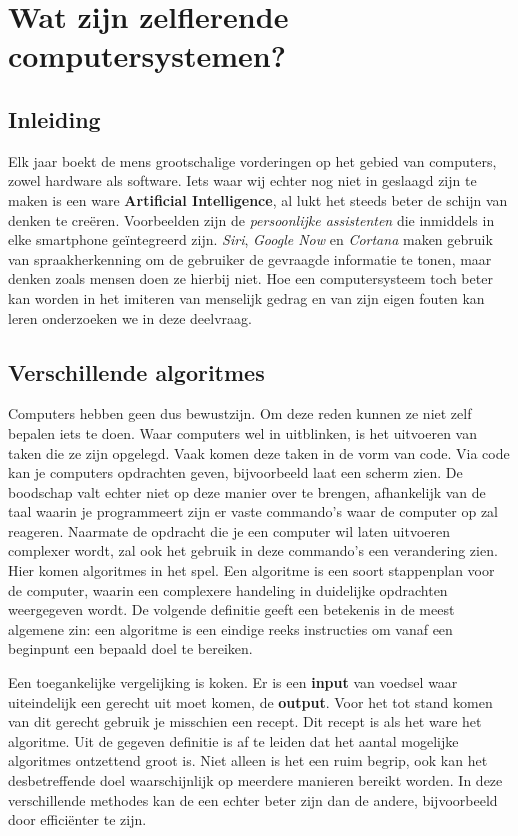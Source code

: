 \section{Wat zijn zelflerende computersystemen?}

\subsection{Inleiding}
Elk jaar boekt de mens grootschalige vorderingen op het gebied van computers, zowel hardware als software. Iets waar wij echter nog niet in geslaagd zijn te maken is een ware \textbf{ Artificial Intelligence}, al lukt het steeds beter de schijn van denken te creëren. Voorbeelden zijn de \textit{persoonlijke assistenten} die inmiddels in elke smartphone geïntegreerd zijn. \textit{Siri}, \textit{Google Now} en \textit{Cortana} maken gebruik van spraakherkenning om de gebruiker de gevraagde informatie te tonen, maar denken zoals mensen doen ze hierbij niet. Hoe een computersysteem toch beter kan worden in het imiteren van menselijk gedrag en van zijn eigen fouten kan leren onderzoeken we in deze deelvraag.


\subsection{Verschillende algoritmes}
Computers hebben geen dus bewustzijn. Om deze reden kunnen ze niet zelf bepalen iets te doen. Waar computers wel in uitblinken, is het uitvoeren van taken die ze zijn opgelegd. Vaak komen deze taken in de vorm van code. Via code kan je computers opdrachten geven, bijvoorbeeld laat een scherm zien. De boodschap valt echter niet op deze manier over te brengen, afhankelijk van de taal waarin je programmeert zijn er vaste commando's waar de computer op zal reageren.
Naarmate de opdracht die je een computer wil laten uitvoeren complexer wordt, zal ook het gebruik in deze commando's een verandering zien. Hier komen algoritmes in het spel. Een algoritme is een soort stappenplan voor de computer, waarin een complexere handeling in duidelijke opdrachten weergegeven wordt. De volgende definitie geeft een betekenis in de meest algemene zin: een algoritme is een eindige reeks instructies om vanaf een beginpunt een bepaald doel te bereiken.\cite{WoordenOrg}

Een toegankelijke vergelijking is koken. Er is een \textbf{input} van voedsel waar uiteindelijk een gerecht uit moet komen, de \textbf{output}. Voor het tot stand komen van dit gerecht gebruik je misschien een recept. Dit recept is als het ware het algoritme.
Uit de gegeven definitie is af te leiden dat het aantal mogelijke algoritmes ontzettend groot is. Niet alleen is het een ruim begrip, ook kan het desbetreffende doel waarschijnlijk op meerdere manieren bereikt worden. In deze verschillende methodes kan de een echter beter zijn dan de andere, bijvoorbeeld door effici\"enter te zijn.

